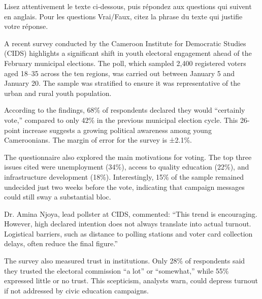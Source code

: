 \documentclass[11pt]{article}
\begin{document}
\begin{exercice}
Lisez attentivement le texte ci-dessous, puis répondez aux questions qui suivent en anglais. Pour les questions Vrai/Faux, citez la phrase du texte qui justifie votre réponse.

\begin{textebox}
A recent survey conducted by the Cameroon Institute for Democratic Studies (CIDS) highlights a significant shift in youth electoral engagement ahead of the February municipal elections. The poll, which sampled 2,400 registered voters aged 18–35 across the ten regions, was carried out between January 5 and January 20. The sample was stratified to ensure it was representative of the urban and rural youth population.

According to the findings, 68\% of respondents declared they would “certainly vote,” compared to only 42\% in the previous municipal election cycle. This 26-point increase suggests a growing political awareness among young Cameroonians. The margin of error for the survey is ±2.1\%.

The questionnaire also explored the main motivations for voting. The top three issues cited were unemployment (34\%), access to quality education (22\%), and infrastructure development (18\%). Interestingly, 15\% of the sample remained undecided just two weeks before the vote, indicating that campaign messages could still sway a substantial bloc.

Dr. Amina Njoya, lead pollster at CIDS, commented: “This trend is encouraging. However, high declared intention does not always translate into actual turnout. Logistical barriers, such as distance to polling stations and voter card collection delays, often reduce the final figure.”

The survey also measured trust in institutions. Only 28\% of respondents said they trusted the electoral commission “a lot” or “somewhat,” while 55\% expressed little or no trust. This scepticism, analysts warn, could depress turnout if not addressed by civic education campaigns.
\end{textebox}


\end{exercice}
\end{document}
